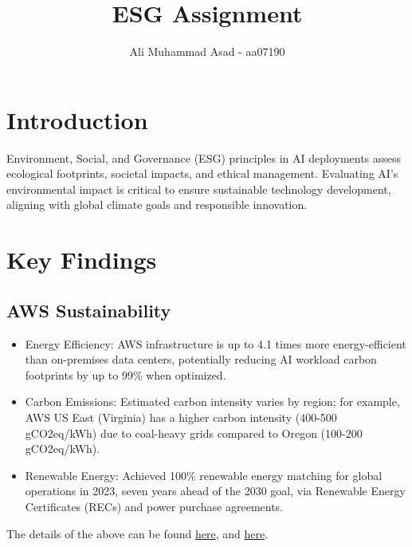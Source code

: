\documentclass{article}
\title{ESG Assignment}
\author{Ali Muhammad Asad - aa07190}
\date{}
\theoremstyle{mytheoremstyle}
\theoremstyle{mytheoremstyle}
\theoremstyle{myproblemstyle}
\begin{document}
\maketitle

\section{Introduction}
Environment, Social, and Governance (ESG) principles in AI deployments assess ecological footprints, societal impacts, and ethical management. Evaluating AI's environmental impact is critical to ensure sustainable technology development, aligning with global climate goals and responsible innovation.

\section{Key Findings}
\subsection{AWS Sustainability} 
\begin{itemize}
    \item Energy Efficiency: AWS infrastructure is up to 4.1 times more energy-efficient than on-premises data centers, potentially reducing AI workload carbon footprints by up to 99\% when optimized.
    \item Carbon Emissions: Estimated carbon intensity varies by region; for example, AWS US East (Virginia) has a higher carbon intensity (400-500 gCO2eq/kWh) due to coal-heavy grids compared to Oregon (100-200 gCO2eq/kWh).
    \item Renewable Energy: Achieved 100\% renewable energy matching for global operations in 2023, seven years ahead of the 2030 goal, via Renewable Energy Certificates (RECs) and power purchase agreements.
\end{itemize}
The details of the above can be found \href{https://www.aboutamazon.com/news/aws/aws-carbon-footprint-ai-workload}{here}, and \href{https://www.aboutamazon.com/news/sustainability/amazon-renewable-energy-goal}{here}.
\end{document}
